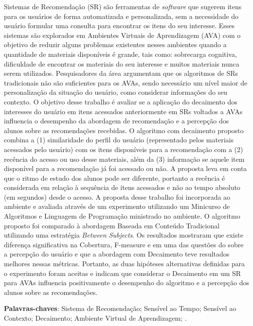\begin{resumo}
  Sistemas de Recomendação (SR) são ferramentas de \textit{software} que sugerem itens para os usuários de forma automatizada e
  personalizada, sem a necessidade do usuário formular uma consulta para encontrar os itens do seu interesse. Esses
  sistemas são explorados em Ambientes Virtuais de Aprendizagem (AVA) com o objetivo de reduzir alguns problemas
  existentes nesses ambientes quando a quantidade de materiais disponíveis é grande, tais como: sobrecarga cognitiva,
  dificuldade de encontrar os materiais do seu interesse e muitos materiais nunca serem utilizados. Pesquisadores da
  área argumentam que os algoritmos de SRs tradicionais não são suficientes para os AVAs, sendo necessário um nível
  maior de personalização da situação do usuário, como considerar informações do seu contexto. O objetivo desse trabalho é
  avaliar se a aplicação do decaimento dos interesses do usuário em itens acessados anteriormente em SRs voltados a AVAs
  influencia o desempenho da abordagem de recomendação e a percepção dos alunos sobre as recomendações recebidas. O
  algoritmo com decaimento proposto combina a (1) similaridade do perfil do usuário
  (representado pelos materiais acessados pelo usuário) com os itens disponíveis para a recomendação com a (2) recência
  do acesso ou uso desse materiais, além da (3) informação se aquele item disponível para a recomendação já foi acessado
  ou não. A proposta leva em conta que o ritmo de estudo dos alunos pode ser diferente, portanto a recência é
  considerada em relação à sequência de itens acessados e não ao tempo absoluto (em segundos) desde o acesso. A proposta
  desse trabalho foi incorporada ao ambiente \adaptwebspace e avaliada através de um experimento utilizando um Minicurso
  de Algoritmos e Linguagem de Programação ministrado no ambiente. O algoritmo proposto foi comparado à abordagem
  Baseada em Conteúdo Tradicional utilizando uma estratégia \textit{Between Subjects}. Os resultados mostraram
  que existe diferença significativa na Cobertura, F-measure e em uma das questões do sobre a percepção do usuário e que
  a abordagem com Decaimento teve resultados melhores nessas métricas. Portanto, as  duas hipóteses alternativas
  definidas para o experimento foram aceitas e indicam que considerar o Decaimento em um SR
  para AVAs influencia positivamente o desempenho do algoritmo e a percepção dos alunos sobre as recomendações.

  \vspace{\onelineskip}

  \noindent
  \textbf{Palavras-chaves}: Sistema de Recomendação; Sensível ao Tempo; Sensível ao Contexto; Decaimento; Ambiente Virtual de Aprendizagem; \adaptweb.
\end{resumo}

